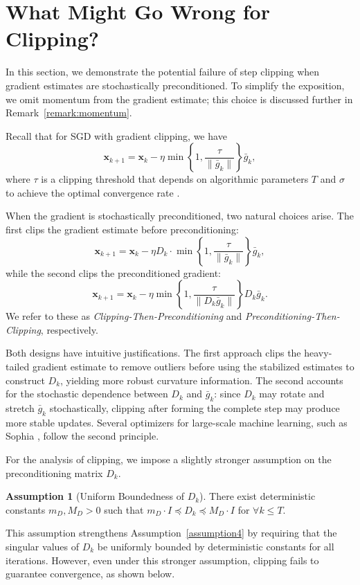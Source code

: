 \documentclass{article}
\newcommand{\bx}{\boldsymbol{x}}
\newcommand{\barg}{\bar{g}}
\theoremstyle{plain}
\theoremstyle{definition}
\newtheorem{assumption}[theorem]{Assumption}
\theoremstyle{remark}
\begin{document}
\section{What Might Go Wrong for Clipping?}\label{sec4:clipping}

In this section, we demonstrate the potential failure of step clipping when gradient estimates are stochastically preconditioned. To simplify the exposition, we omit momentum from the gradient estimate; this choice is discussed further in Remark~\ref{remark:momentum}.

Recall that for SGD with gradient clipping, we have
\begin{equation*}
    \bx_{k+1} = \bx_k - \eta \min\left\{1,\frac{\tau}{\|\barg_k\|}\right\}\barg_k,
\end{equation*}
where $\tau$ is a clipping threshold that depends on algorithmic parameters $T$ and $\sigma$ to achieve the optimal convergence rate \citep{Zhang2020Adaptive}.

When the gradient is stochastically preconditioned, two natural choices arise. The first clips the gradient estimate before preconditioning:
\begin{equation*}
    \bx_{k+1} = \bx_k - \eta D_k \cdot\min\left\{1,\frac{\tau}{\|\barg_k\|}\right\}\barg_k,
\end{equation*}
while the second clips the preconditioned gradient:
\begin{equation*}
    \bx_{k+1} = \bx_k - \eta \min\left\{1,\frac{\tau}{\|D_k\barg_k\|}\right\}D_k\barg_k.
\end{equation*}
We refer to these as \textit{Clipping-Then-Preconditioning} and \textit{Preconditioning-Then-Clipping}, respectively.

Both designs have intuitive justifications. The first approach clips the heavy-tailed gradient estimate to remove outliers before using the stabilized estimates to construct $D_k$, yielding more robust curvature information. The second accounts for the stochastic dependence between $D_k$ and $\barg_k$: since $D_k$ may rotate and stretch $\barg_k$ stochastically, clipping after forming the complete step may produce more stable updates. Several optimizers for large-scale machine learning, such as Sophia \citep{Liu2024Sophia},  follow the second principle.

For the analysis of clipping, we impose a slightly stronger assumption on the preconditioning matrix $D_k$.
\begin{assumption}[Uniform Boundedness of $D_k$]\label{assumption5}
    There exist deterministic constants $m_D,M_D>0$ such that $m_D\cdot I \preceq D_k \preceq M_D\cdot I$ for $\forall k \leq T$.
\end{assumption}
This assumption strengthens Assumption~\ref{assumption4} by requiring that the singular values of $D_k$ be uniformly bounded by deterministic constants for all iterations. However, even under this stronger assumption, clipping fails to guarantee convergence, as shown below.
\end{document}
